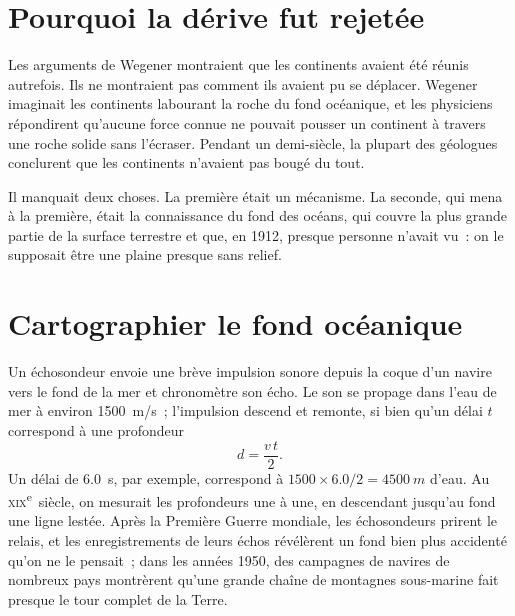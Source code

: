 \section{Pourquoi la dérive fut rejetée}

Les arguments de Wegener montraient que les continents avaient été réunis
autrefois. Ils ne montraient pas comment ils avaient pu se déplacer. Wegener
imaginait les continents labourant la roche du fond océanique, et les
physiciens répondirent qu'aucune force connue ne pouvait pousser un
continent à travers une roche solide sans l'écraser. Pendant un demi-siècle,
la plupart des géologues conclurent que les continents n'avaient pas bougé
du tout.

Il manquait deux choses. La première était un mécanisme. La seconde, qui
mena à la première, était la connaissance du fond des océans, qui couvre la
plus grande partie de la surface terrestre et que, en 1912, presque personne
n'avait vu~: on le supposait être une plaine presque sans relief.

\section{Cartographier le fond océanique}

Un échosondeur envoie une brève impulsion sonore depuis la coque d'un
navire vers le fond de la mer et chronomètre son écho. Le son se propage
dans l'eau de mer à environ \qty{1500}{m/s}~; l'impulsion descend et
remonte, si bien qu'un délai $t$ correspond à une profondeur
\[
  d = \frac{v\,t}{2}.
\]
Un délai de \qty{6.0}{s}, par exemple, correspond à $1500 \times 6.0/2 =
\qty{4500}{m}$ d'eau. Au \textsc{xix}\textsuperscript{e}~siècle, on mesurait
les profondeurs une à une, en descendant jusqu'au fond une ligne lestée.
Après la Première Guerre mondiale, les échosondeurs prirent le relais, et
les enregistrements de leurs échos révélèrent un fond bien plus accidenté
qu'on ne le pensait~; dans les années 1950, des campagnes de navires de
nombreux pays montrèrent qu'une grande chaîne de montagnes sous-marine fait
presque le tour complet de la Terre.

